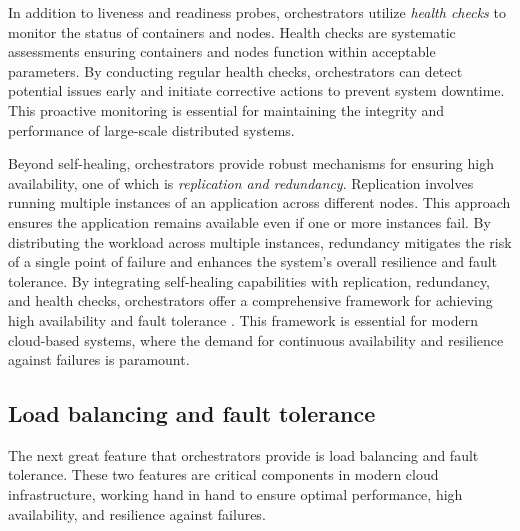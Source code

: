 In addition to liveness and readiness probes, orchestrators utilize
\textit{health checks} to monitor the status of containers and nodes.
Health checks are systematic assessments ensuring containers and nodes function
within acceptable parameters.
By conducting regular health checks, orchestrators can detect potential issues
early and initiate corrective actions to prevent system downtime. This proactive
monitoring is essential for maintaining the integrity and performance of
large-scale distributed systems.

Beyond self-healing, orchestrators provide robust mechanisms for ensuring high
availability, one of which is \textit{replication and redundancy}.
Replication involves running multiple instances of an application across
different nodes.
This approach ensures the application remains available even if one or more
instances fail.
By distributing the workload across multiple instances, redundancy mitigates the
risk of a single point of failure and enhances the system's overall resilience
and fault tolerance.
By integrating self-healing capabilities with replication, redundancy, and
health checks, orchestrators offer a comprehensive framework for achieving high
availability and fault tolerance \cite{Brendan2016}.
This framework is essential for modern cloud-based systems, where the demand for
continuous availability and resilience against failures is paramount.


\subsection{Load balancing and fault tolerance}\label{subsec:chpt1-load balancing}

The next great feature that orchestrators provide is load balancing and fault
tolerance.
These two features are critical components in modern cloud infrastructure,
working hand in hand to ensure optimal performance, high availability, and
resilience against failures.

